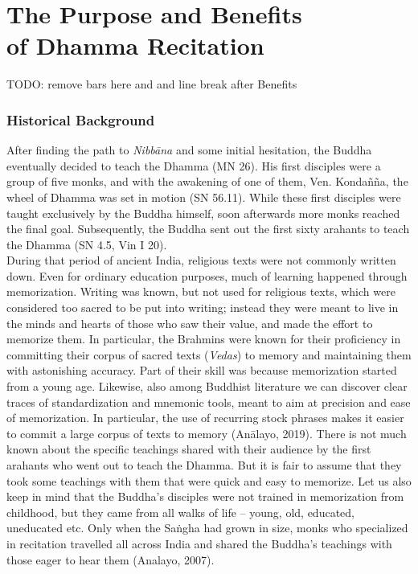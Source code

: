 \chapter[The Purpose and Benefits of Dhamma Recitation]{The Purpose and Benefits \\ of Dhamma Recitation}
TODO: remove bars here and and line break after Benefits
\label{purpose-and-benefits}

\subsection*{Historical Background}

After finding the path to \textit{Nibbāna} and some initial hesitation, the Buddha eventually decided to teach the Dhamma (MN 26). His first disciples were a group of five monks, and with the awakening of one of them, Ven. Kondañña, the wheel of Dhamma was set in motion (SN 56.11). While these first disciples were taught exclusively by the Buddha himself, soon afterwards more monks reached the final goal. Subsequently, the Buddha sent out the first sixty arahants to teach the Dhamma (SN 4.5, Vin I 20).\\

During that period of ancient India, religious texts were not commonly written down. Even for ordinary education purposes, much of learning happened through memorization. Writing was known, but not used for religious texts, which were considered too sacred to be put into writing; instead they were meant to live in the minds and hearts of those who saw their value, and made the effort to memorize them. In particular, the Brahmins were known for their proficiency in committing their corpus of sacred texts (\textit{Vedas}) to memory and maintaining them with astonishing accuracy. Part of their skill was because memorization started from a young age. Likewise, also among Buddhist literature we can discover clear traces of standardization and mnemonic tools, meant to aim at precision and ease of memorization. In particular, the use of recurring stock phrases makes it easier to commit a large corpus of texts to memory (Anālayo, 2019). There is not much known about the specific teachings shared with their audience by the first arahants who went out to teach the Dhamma. But it is fair to assume that they took some teachings with them that were quick and easy to memorize. Let us also keep in mind that the Buddha's disciples were not trained in memorization from childhood, but they came from all walks of life – young, old, educated, uneducated etc. Only when the Saṅgha had grown in size, monks who specialized in recitation travelled all across India and shared the Buddha's teachings with those eager to hear them (Analayo, 2007).\\

